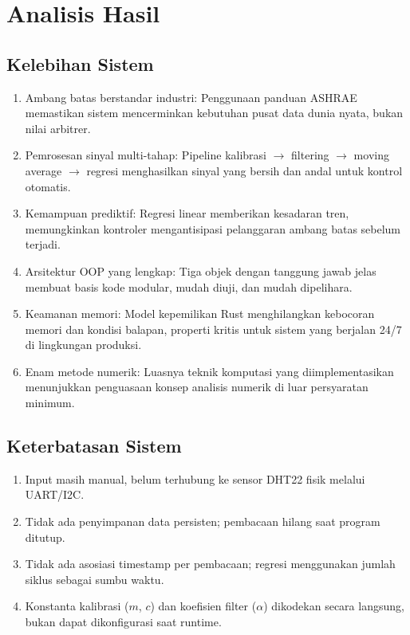 \documentclass[journal]{IEEEtran}
\begin{document}
\section{Analisis Hasil}

\subsection{Kelebihan Sistem}
\begin{enumerate}
  \item {Ambang batas berstandar industri}: Penggunaan panduan ASHRAE memastikan sistem mencerminkan kebutuhan pusat data dunia nyata, bukan nilai arbitrer.
  \item {Pemrosesan sinyal multi-tahap}: Pipeline kalibrasi $\rightarrow$ filtering $\rightarrow$ moving average $\rightarrow$ regresi menghasilkan sinyal yang bersih dan andal untuk kontrol otomatis.
  \item {Kemampuan prediktif}: Regresi linear memberikan kesadaran tren, memungkinkan kontroler mengantisipasi pelanggaran ambang batas sebelum terjadi.
  \item {Arsitektur OOP yang lengkap}: Tiga objek dengan tanggung jawab jelas membuat basis kode modular, mudah diuji, dan mudah dipelihara.
  \item {Keamanan memori}: Model kepemilikan Rust menghilangkan kebocoran memori dan kondisi balapan, properti kritis untuk sistem yang berjalan 24/7 di lingkungan produksi.
  \item {Enam metode numerik}: Luasnya teknik komputasi yang diimplementasikan menunjukkan penguasaan konsep analisis numerik di luar persyaratan minimum.
\end{enumerate}

\subsection{Keterbatasan Sistem}
\begin{enumerate}
  \item Input masih manual, belum terhubung ke sensor DHT22 fisik melalui UART/I2C.
  \item Tidak ada penyimpanan data persisten; pembacaan hilang saat program ditutup.
  \item Tidak ada asosiasi timestamp per pembacaan; regresi menggunakan jumlah siklus sebagai sumbu waktu.
  \item Konstanta kalibrasi ($m$, $c$) dan koefisien filter ($\alpha$) dikodekan secara langsung, bukan dapat dikonfigurasi saat runtime.
\end{enumerate}
\end{document}
